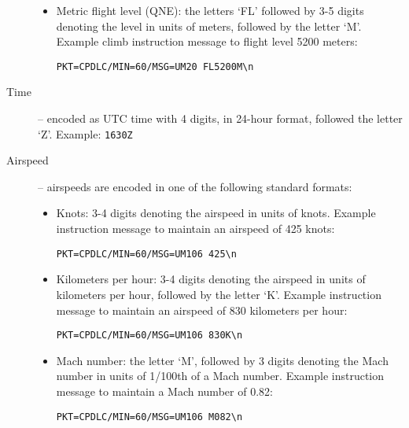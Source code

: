 \documentclass[a4paper,12pt]{article}
\begin{document}
\begin{description}
\begin{itemize}
\item Metric flight level (QNE): the letters `FL' followed by 3-5 digits
denoting the level in units of meters, followed by the letter `M'.
Example climb instruction message to flight level 5200 meters:

\begin{verbatim}
PKT=CPDLC/MIN=60/MSG=UM20 FL5200M\n
\end{verbatim}

\end{itemize}

\item[Time] -- encoded as UTC time with 4 digits, in 24-hour format,
followed the letter `Z'. Example: \texttt{1630Z}

\item[Airspeed] -- airspeeds are encoded in one of the following standard
formats:

\begin{itemize}

\item Knots: 3-4 digits denoting the airspeed in units of knots. Example
instruction message to maintain an airspeed of 425 knots:

\begin{verbatim}
PKT=CPDLC/MIN=60/MSG=UM106 425\n
\end{verbatim}

\item Kilometers per hour: 3-4 digits denoting the airspeed in units
of kilometers per hour, followed by the letter `K'. Example instruction
message to maintain an airspeed of 830 kilometers per hour:

\begin{verbatim}
PKT=CPDLC/MIN=60/MSG=UM106 830K\n
\end{verbatim}

\item Mach number: the letter `M', followed by 3 digits denoting the
Mach number in units of 1/100th of a Mach number. Example instruction
message to maintain a Mach number of 0.82:

\begin{verbatim}
PKT=CPDLC/MIN=60/MSG=UM106 M082\n
\end{verbatim}

\end{itemize}

\end{description}
\end{document}
